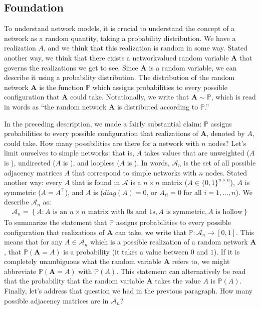 \documentclass[letterpaper,10pt,english]{jupyterBook}
\begin{document}
\subsection{Foundation}
\label{\detokenize{representations/ch5/single-network-models_theory:foundation}}
\sphinxAtStartPar
To understand network models, it is crucial to understand the concept of a network as a random quantity, taking a probability distribution. We have a realization \(A\), and we think that this realization is random in some way. Stated another way, we think that there exists a network\sphinxhyphen{}valued random variable \(\mathbf A\) that governs the realizations we get to see. Since \(\mathbf A\) is a random variable, we can describe it using a probability distribution. The distribution of the random network \(\mathbf A\) is the function \(\mathbb P\) which assigns probabilities to every possible configuration that \(\mathbf A\) could take. Notationally, we write that \(\mathbf A \sim \mathbb P\), which is read in words as “the random network \(\mathbf A\) is distributed according to \(\mathbb P\).”

\sphinxAtStartPar
In the preceding description, we made a fairly substantial claim: \(\mathbb P\) assigns probabilities to every possible configuration that realizations of \(\mathbf A\), denoted by \(A\), could take. How many possibilities are there for a network with \(n\) nodes? Let’s limit ourselves to simple networks: that is, \(A\) takes values that are unweighted (\(A\) is ), undirected (\(A\) is ), and loopless (\(A\) is ). In words, \(\mathcal A_n\) is the set of all possible adjacency matrices \(A\) that correspond to simple networks with \(n\) nodes. Stated another way: every \(A\) that is found in \(\mathcal A\) is a  \(n \times n\) matrix (\(A \in \{0, 1\}^{n \times n}\)), \(A\) is symmetric (\(A = A^\top\)), and \(A\) is  (\(diag(A) = 0\), or \(A_{ii} = 0\) for all \(i = 1,...,n\)). We describe \(\mathcal A_n\) as:
\begin{align*}
    \mathcal A_n = \left\{A : A \textrm{ is an $n \times n$ matrix with $0$s and $1$s}, A\textrm{ is symmetric}, A\textrm{ is hollow}\right\}
\end{align*}
\sphinxAtStartPar
To summarize the statement that \(\mathbb P\) assigns probabilities to every possible configuration that realizations of \(\mathbf A\) can take, we write that \(\mathbb P : \mathcal A_n \rightarrow [0, 1]\). This means that for any \(A \in \mathcal A_n\) which is a possible realization of a random network \(\mathbf A\), that \(\mathbb P(\mathbf A = A)\) is a probability (it takes a value between \(0\) and \(1\)). If it is completely unambiguous what the random variable \(\mathbf A\) refers to, we might abbreviate \(\mathbb P(\mathbf A = A)\) with \(\mathbb P(A)\). This statement can alternatively be read that the probability that the random variable \(\mathbf A\) takes the value \(A\) is \(\mathbb P(A)\). Finally, let’s address that question we had in the previous paragraph. How many possible adjacency matrices are in \(\mathcal A_n\)?
\end{document}

